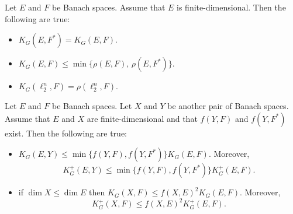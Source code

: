 \documentclass[10pt,a4paper]{amsart}
\begin{document}
\begin{lemma} \label{basic-properties-KG}
Let $E$ and $F$ be Banach spaces. Assume that $E$ is finite-dimensional. Then the following are true:
	\begin{itemize}
		\item[(i)] $K_G(E,F^*)= K_G(E,F).$
		\item[(ii)] $K_G(E,F)\leqslant \min\{\rho(E,F),\, \rho(E,F^*)\}.$
		\item[(iii)]  $K_G(\ell_2^n,F)=\rho(\ell_2^n,F).$
		\end{itemize}
\end{lemma}

\begin{lemma}\label{KG and Subspaces}
Let $E$ and $F$ be Banach spaces. Let $X$ and $Y$ be another pair of Banach spaces. Assume that $E$ and $X$ are finite-dimensional 
and that $f(Y,F)$ and $f(Y,F^*)$ exist. 
Then the following are true:
\begin{itemize}
 \item[(i)] 
$K_G(E,Y)\leqslant \min\{f(Y,F), f(Y,F^*)\}K_G(E,F).$ Moreover,
\[K_G^{+}(E,Y)\leqslant \min\{f(Y,F), f(Y,F^*)\}K_G^{+}(E,F).\]
 \item[(ii)] 
 if $\dim X\leqslant\dim E$ then 
 $K_G(X,F)\leqslant {f}(X,E)^2 K_G(E,F).$ Moreover,  \[K_G^{+}(X,F)\leqslant {f}(X,E)^2 K_G^{+}(E,F).\]
\end{itemize}
\end{lemma}
\end{document}
